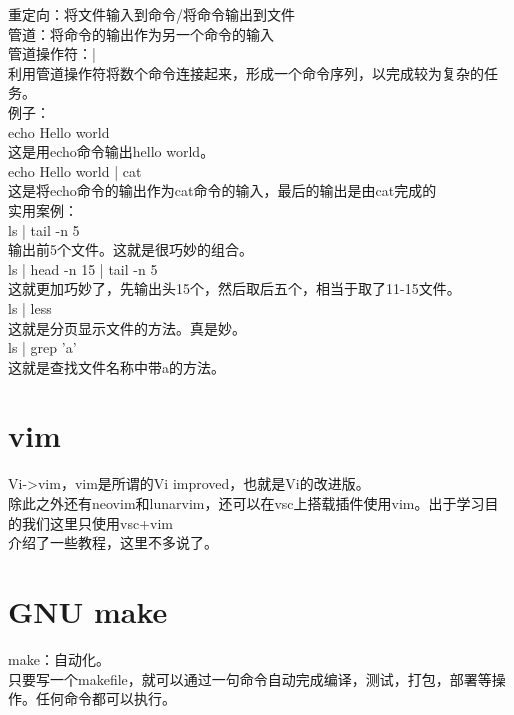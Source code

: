 \documentclass{article}
\begin{document}
\noindent
重定向：将文件输入到命令/将命令输出到文件\\
管道：将命令的输出作为另一个命令的输入\\
管道操作符：|\\
利用管道操作符将数个命令连接起来，形成一个命令序列，以完成较为复杂的任务。\\

\noindent
例子：\\
echo Hello world\\
这是用echo命令输出hello world。\\
echo Hello world | cat\\
这是将echo命令的输出作为cat命令的输入，最后的输出是由cat完成的\\
实用案例：\\
ls | tail -n 5\\
输出前5个文件。这就是很巧妙的组合。\\
ls | head -n 15 | tail -n 5\\
这就更加巧妙了，先输出头15个，然后取后五个，相当于取了11-15文件。\\
ls | less\\
这就是分页显示文件的方法。真是妙。\\
ls | grep 'a'\\
这就是查找文件名称中带a的方法。\\

\section{vim}

Vi->vim，vim是所谓的Vi improved，也就是Vi的改进版。\\
除此之外还有neovim和lunarvim，还可以在vsc上搭载插件使用vim。出于学习目的我们这里只使用vsc+vim\\

介绍了一些教程，这里不多说了。\\

\noindent
\section{GNU make}

make：自动化。\\
只要写一个makefile，就可以通过一句命令自动完成编译，测试，打包，部署等操作。任何命令都可以执行。\\
\end{document}
